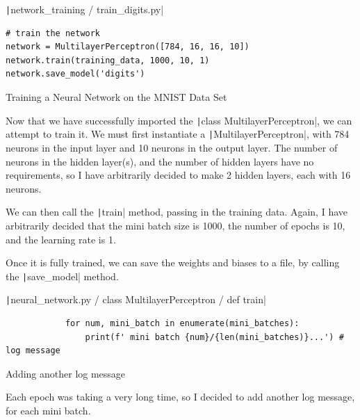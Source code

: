 \documentclass[12pt]{report}
\newcommand{\pil}[1]{\protect\texttt|#1|}
\begin{document}
\begin{listing}[H]
\pil{network_training / train_digits.py}
\begin{verbatim}
# train the network
network = MultilayerPerceptron([784, 16, 16, 10])
network.train(training_data, 1000, 10, 1)
network.save_model('digits')
\end{verbatim}
\caption{Training a Neural Network on the MNIST Data Set}\label{cs:trainOnMNIST}
\end{listing}

Now that we have successfully imported the \pil{class MultilayerPerceptron}, we can attempt to train it. We must first instantiate a \pil{MultilayerPerceptron}, with 784 neurons in the input layer and 10 neurons in the output layer. The number of neurons in the hidden layer(s), and the number of hidden layers have no requirements, so I have arbitrarily decided to make 2 hidden layers, each with 16 neurons.

We can then call the \pil{train} method, passing in the training data. Again, I have arbitrarily decided that the mini batch size is 1000, the number of epochs is 10, and the learning rate is 1.

Once it is fully trained, we can save the weights and biases to a file, by calling the \pil{save_model} method.

\begin{listing}[H]
\pil{neural_network.py / class MultilayerPerceptron / def train}
\begin{verbatim}
            for num, mini_batch in enumerate(mini_batches):
                print(f' mini batch {num}/{len(mini_batches)}...') # log message
\end{verbatim}
\caption{Adding another log message}\label{cs:moreLogs}
\end{listing}

Each epoch was taking a very long time, so I decided to add another log message, for each mini batch.

\begin{center}
\end{center}
\end{document}
